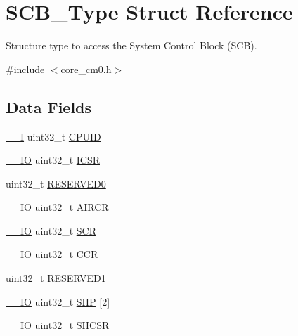 \hypertarget{struct_s_c_b___type}{}\section{S\+C\+B\+\_\+\+Type Struct Reference}
\label{struct_s_c_b___type}


Structure type to access the System Control Block (S\+CB).  




{\ttfamily \#include $<$core\+\_\+cm0.\+h$>$}

\subsection*{Data Fields}
\begin{DoxyCompactItemize}
\item 
\mbox{\hyperlink{core__sc300_8h_af63697ed9952cc71e1225efe205f6cd3}{\+\_\+\+\_\+I}} uint32\+\_\+t \mbox{\hyperlink{struct_s_c_b___type_a30abfea43143a424074f682bd61eace0}{C\+P\+U\+ID}}
\item 
\mbox{\hyperlink{core__sc300_8h_aec43007d9998a0a0e01faede4133d6be}{\+\_\+\+\_\+\+IO}} uint32\+\_\+t \mbox{\hyperlink{struct_s_c_b___type_a8fec9e122b923822e7f951cd48cf1d47}{I\+C\+SR}}
\item 
uint32\+\_\+t \mbox{\hyperlink{struct_s_c_b___type_af86c61a5d38a4fc9cef942a12744486b}{R\+E\+S\+E\+R\+V\+E\+D0}}
\item 
\mbox{\hyperlink{core__sc300_8h_aec43007d9998a0a0e01faede4133d6be}{\+\_\+\+\_\+\+IO}} uint32\+\_\+t \mbox{\hyperlink{struct_s_c_b___type_aaec159b48828355cb770049b8b2e8d91}{A\+I\+R\+CR}}
\item 
\mbox{\hyperlink{core__sc300_8h_aec43007d9998a0a0e01faede4133d6be}{\+\_\+\+\_\+\+IO}} uint32\+\_\+t \mbox{\hyperlink{struct_s_c_b___type_a64a95891ad3e904dd5548112539c1c98}{S\+CR}}
\item 
\mbox{\hyperlink{core__sc300_8h_aec43007d9998a0a0e01faede4133d6be}{\+\_\+\+\_\+\+IO}} uint32\+\_\+t \mbox{\hyperlink{struct_s_c_b___type_a5e1322e27c40bf91d172f9673f205c97}{C\+CR}}
\item 
uint32\+\_\+t \mbox{\hyperlink{struct_s_c_b___type_ac4ac04e673b5b8320d53f7b0947db902}{R\+E\+S\+E\+R\+V\+E\+D1}}
\item 
\mbox{\hyperlink{core__sc300_8h_aec43007d9998a0a0e01faede4133d6be}{\+\_\+\+\_\+\+IO}} uint32\+\_\+t \mbox{\hyperlink{struct_s_c_b___type_af6c413ed8c7d1b792a91f01e13b47adf}{S\+HP}} \mbox{[}2\mbox{]}
\item 
\mbox{\hyperlink{core__sc300_8h_aec43007d9998a0a0e01faede4133d6be}{\+\_\+\+\_\+\+IO}} uint32\+\_\+t \mbox{\hyperlink{struct_s_c_b___type_a04d136e5436e5fa2fb2aaa78a5f86b19}{S\+H\+C\+SR}}

\end{DoxyCompactItemize}
